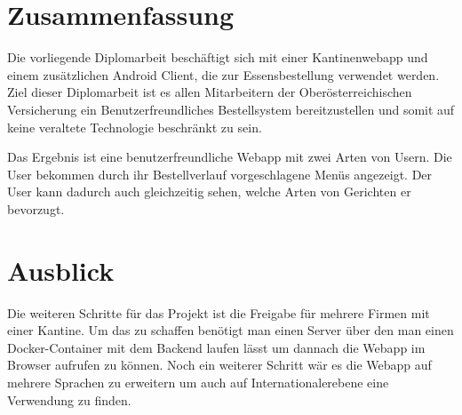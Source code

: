 \section{Zusammenfassung}
\author{Bozidar Spasenovic}
Die vorliegende Diplomarbeit beschäftigt sich mit einer Kantinenwebapp und einem zusätzlichen Android Client, die zur Essensbestellung
verwendet werden. Ziel dieser Diplomarbeit ist es allen Mitarbeitern der Oberösterreichischen Versicherung ein Benutzerfreundliches Bestellsystem
bereitzustellen und somit auf keine veraltete Technologie beschränkt zu sein. 

Das Ergebnis ist eine benutzerfreundliche Webapp mit zwei Arten von Usern. Die User bekommen durch ihr Bestellverlauf vorgeschlagene
Menüs angezeigt. Der User kann dadurch auch gleichzeitig sehen, welche Arten von Gerichten er bevorzugt.

\section{Ausblick}
Die weiteren Schritte für das Projekt ist die Freigabe für mehrere Firmen mit einer Kantine. Um das zu schaffen benötigt man einen Server
über den man einen Docker-Container mit dem Backend laufen lässt um dannach die Webapp im Browser aufrufen zu können. Noch ein
weiterer Schritt wär es die Webapp auf mehrere Sprachen zu erweitern um auch auf Internationalerebene eine Verwendung zu finden.